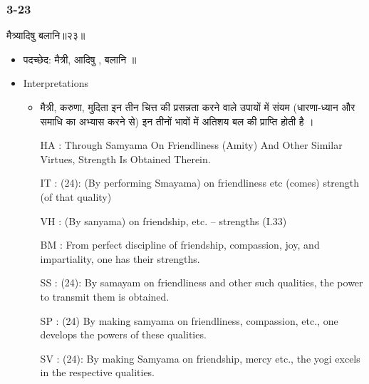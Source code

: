 \begin{frame}[fragile]\frametitle{3-23}
\begin{sanskrit}
मैत्र्यादिषु बलानि॥२३॥
\end{sanskrit}

	\begin{itemize}
	\item पदच्छेद:  मैत्री, आदिषु , बलानि ॥
	\item Interpretations
		\begin{itemize}	
		\item मैत्री, करुणा, मुदिता इन तीन चित्त की प्रसन्नता करने वाले उपायों में संयम (धारणा-ध्यान और समाधि का अभ्यास करने से) इन तीनों भावों में अतिशय बल की प्राप्ति होती है ।
		\item [HA]: Through Samyama On Friendliness (Amity) And Other Similar Virtues, Strength Is Obtained Therein.
		\item [IT]: (24): (By performing Smayama) on friendliness etc (comes) strength (of that quality)
		\item [VH]: (By sanyama) on friendship, etc. – strengths (I.33)
		\item [BM]: From perfect discipline of friendship, compassion, joy, and impartiality, one has their strengths.
		\item [SS]: (24): By samayam on friendliness and other such qualities, the power to transmit them is obtained.
		\item [SP]: (24) By making samyama on friendliness, compassion, etc., one develops the powers of these qualities.
		\item [SV]: (24): By making Samyama on friendship, mercy etc., the yogi excels in the respective qualities.
		\end{itemize}
	\end{itemize}
\end{frame}


